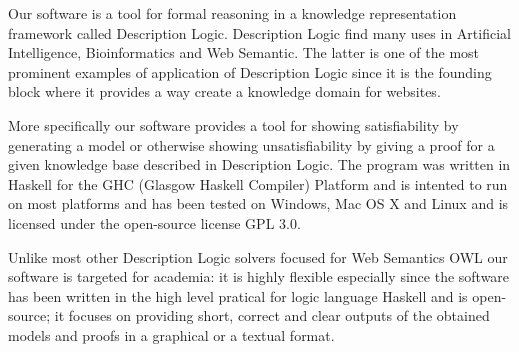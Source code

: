Our software is a tool for formal reasoning in a knowledge
representation framework called Description Logic. Description Logic
find many uses in Artificial Intelligence, Bioinformatics and Web
Semantic. The latter is one of the most prominent examples of application of
Description Logic since it is the founding block where it 
provides a way create a knowledge domain for websites.

More specifically our software provides a tool for showing
satisfiability by generating a model or otherwise showing
unsatisfiability by giving a proof for a given knowledge base
described in Description Logic. The program was written in Haskell for
the GHC (Glasgow Haskell Compiler) Platform and is intented to run on
most platforms and has been tested on Windows, Mac OS X and Linux and
is licensed under the open-source license GPL 3.0.

Unlike most other Description Logic solvers focused for Web Semantics
OWL our software is targeted for academia: it is highly flexible
especially since the software has been written in the high level
pratical for logic language Haskell and is open-source; it focuses on
providing short, correct and clear outputs of the obtained models and
proofs in a graphical or a textual format.

